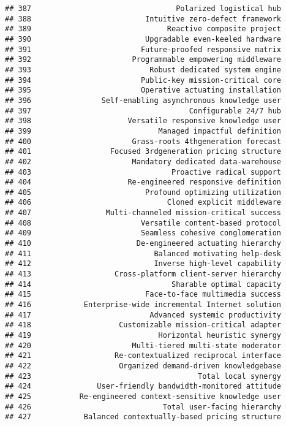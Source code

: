 \documentclass[
]{article}
\begin{document}
\begin{verbatim}
## 387                                 Polarized logistical hub
## 388                          Intuitive zero-defect framework
## 389                               Reactive composite project
## 390                          Upgradable even-keeled hardware
## 391                         Future-proofed responsive matrix
## 392                       Programmable empowering middleware
## 393                           Robust dedicated system engine
## 394                         Public-key mission-critical core
## 395                         Operative actuating installation
## 396                Self-enabling asynchronous knowledge user
## 397                                    Configurable 24/7 hub
## 398                      Versatile responsive knowledge user
## 399                             Managed impactful definition
## 400                       Grass-roots 4thgeneration forecast
## 401                  Focused 3rdgeneration pricing structure
## 402                       Mandatory dedicated data-warehouse
## 403                                Proactive radical support
## 404                      Re-engineered responsive definition
## 405                          Profound optimizing utilization
## 406                               Cloned explicit middleware
## 407                 Multi-channeled mission-critical success
## 408                         Versatile content-based protocol
## 409                         Seamless cohesive conglomeration
## 410                        De-engineered actuating hierarchy
## 411                            Balanced motivating help-desk
## 412                            Inverse high-level capability
## 413                   Cross-platform client-server hierarchy
## 414                                Sharable optimal capacity
## 415                          Face-to-face multimedia success
## 416            Enterprise-wide incremental Internet solution
## 417                           Advanced systemic productivity
## 418                    Customizable mission-critical adapter
## 419                             Horizontal heuristic synergy
## 420                       Multi-tiered multi-state moderator
## 421                   Re-contextualized reciprocal interface
## 422                    Organized demand-driven knowledgebase
## 423                                      Total local synergy
## 424               User-friendly bandwidth-monitored attitude
## 425           Re-engineered context-sensitive knowledge user
## 426                              Total user-facing hierarchy
## 427            Balanced contextually-based pricing structure

\end{verbatim}
\end{document}
